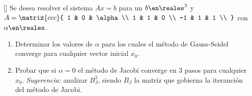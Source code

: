 \begin{enunciado}{\ejExtra}[{\tiny{}}]
  Se desea resolver el sistema $Ax = b$ para un $b \en \reales^3$ y
  $A = \matriz{ccc}{
      1 & 0 & \alpha \\
      1 & 1 & 0 \\
      -1 & 1 & 1 \\
    }$
  con $\alpha \en \reales$.
  \begin{enumerate}[label=(\alph*)]
    \item Determinar los valores de $\alpha$ para los cuales el método de Gauss-Seidel converge para cualquier vector inicial $x_0$.

    \item Probar que si $\alpha = 0$ el método de Jacobi converge en 3 pasos para cualquier $x_0$.
          \textit{Sugerencia:} analizar $B_J^3$, siendo $B_J$ la matriz que gobierna la iteranción del método de Jacobi.
  \end{enumerate}
\end{enunciado}
